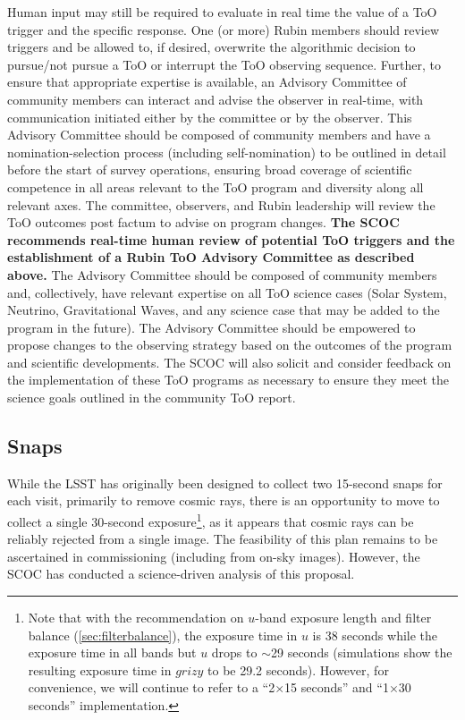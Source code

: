 Human input may still be required to evaluate in real time the value of a ToO trigger and the specific response.  One (or more) Rubin members %
should review triggers and be allowed to, if desired, overwrite the algorithmic decision to pursue/not pursue a ToO or interrupt the ToO observing sequence. Further, to ensure that appropriate expertise is available, an Advisory Committee of community members can interact and advise the observer in real-time, with communication initiated either by the committee or by the observer. 
This Advisory Committee should be composed of community members and have a nomination-selection process (including self-nomination) to be outlined in detail before the start of survey operations, ensuring broad coverage of scientific competence in all areas relevant to the ToO program and diversity along all relevant axes.
The committee, observers, and Rubin leadership will review the ToO outcomes post factum to advise on program changes. 
{\bf The SCOC recommends real-time human review of potential ToO triggers and the establishment of a Rubin ToO Advisory Committee as described above.} The Advisory Committee should be composed of community members and, collectively, have relevant expertise on all ToO science cases (Solar System, Neutrino, Gravitational Waves, and any science case that may be added to the program in the future). The Advisory Committee should be empowered to propose changes to the observing strategy based on the outcomes of the program and scientific developments. The SCOC will also solicit and consider feedback on the implementation of these ToO programs as necessary to ensure they meet the science goals outlined in the community ToO report. 



\subsection{Snaps}\label{sec:snaps}


While the LSST has originally been designed to collect two 15-second snaps for each visit, primarily to remove cosmic rays, there is an opportunity to move to collect a single 30-second exposure\footnote{Note that with the recommendation on $u$-band exposure length and filter balance (\autoref{sec:filterbalance}), the exposure time in $u$ is 38 seconds while the exposure time in all bands but $u$ drops to \mbox{$\sim$29} seconds (simulations show the resulting exposure time in $grizy$ to be 29.2 seconds). However, for convenience, we will continue to refer to a ``\mbox{2$\times$15} seconds'' and ``\mbox{1$\times$30} seconds'' implementation.}, as it appears that cosmic rays can be reliably rejected from a single image. The feasibility of this plan remains to be ascertained in commissioning (including from on-sky images). However, the SCOC has conducted a science-driven analysis of this proposal. 

